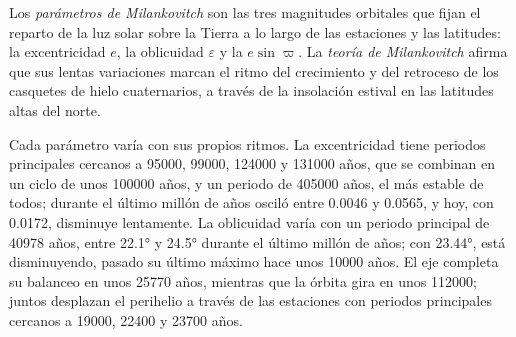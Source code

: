 \begin{definition}\label{def:b2:orbital-forcing:milankovitch}
Los \emph{parámetros de Milankovitch} son las tres magnitudes
orbitales que fijan el reparto de la luz solar sobre la Tierra a lo largo de las estaciones y las
latitudes: la excentricidad $e$, la oblicuidad $\varepsilon$ y la 
$e\sin\varpi$. La \emph{teoría de Milankovitch} afirma que sus lentas
variaciones marcan el ritmo del crecimiento y del retroceso de los casquetes de hielo cuaternarios, a través de la insolación estival
en las latitudes altas del norte.
\end{definition}

Cada parámetro varía con sus propios ritmos. La excentricidad tiene periodos principales cercanos a \num{95000},
\num{99000}, \num{124000} y \num{131000} años, que se combinan en un ciclo de unos
\num{100000} años, y un periodo de \num{405000} años, el más estable de todos; durante el último
millón de años osciló entre \num{0.0046} y \num{0.0565}, y hoy, con \num{0.0172}, disminuye
lentamente. La oblicuidad varía con un periodo principal de \num{40978} años, entre \ang{22.1} y
\ang{24.5} durante el último millón de años; con \ang{23.44}, está disminuyendo, pasado su último máximo
hace unos \num{10000} años. El eje completa su balanceo en unos \num{25770} años, mientras que la
órbita gira en unos \num{112000}; juntos desplazan el perihelio a través de las estaciones con
periodos principales cercanos a \num{19000}, \num{22400} y \num{23700} años.


